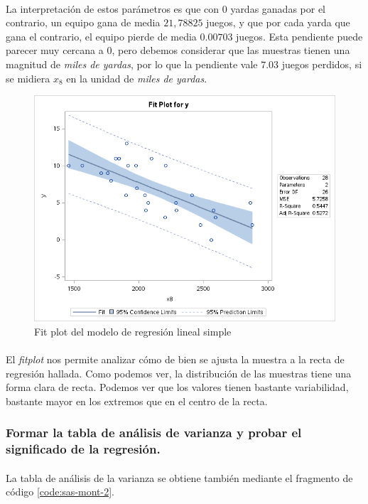 \documentclass{article}
\begin{document}
  \paragraph{}
  La interpretación de estos parámetros es que con 0 yardas ganadas por el contrario, un equipo gana de media $21,78825$ juegos, y que por cada yarda que gana el contrario, el equipo pierde de media $0.00703$ juegos. Esta pendiente puede parecer muy cercana a 0, pero debemos considerar que las muestras tienen una magnitud de \emph{miles de yardas}, por lo que la pendiente vale $7.03$ juegos perdidos, si se midiera $x_8$ en la unidad de \emph{miles de yardas}.

  \begin{figure}[H]
    \centering
    \includegraphics[width=.8\linewidth]{img/montgomery/fitplot.png}
    \caption{Fit plot del modelo de regresión lineal simple}
    \label{img:mont-fitplot}
  \end{figure}

  \paragraph{}
  El \emph{fitplot} nos permite analizar cómo de bien se ajusta la muestra a la recta de regresión hallada. Como podemos ver, la distribución de las muestras tiene una forma clara de recta. Podemos ver que los valores tienen bastante variabilidad, bastante mayor en los extremos que en el centro de la recta.

  \subsubsection{Formar la tabla de análisis de varianza y probar el significado de la regresión.}

  \paragraph{}
  La tabla de análisis de la varianza se obtiene también mediante el fragmento de código \ref{code:sas-mont-2}.
\end{document}
